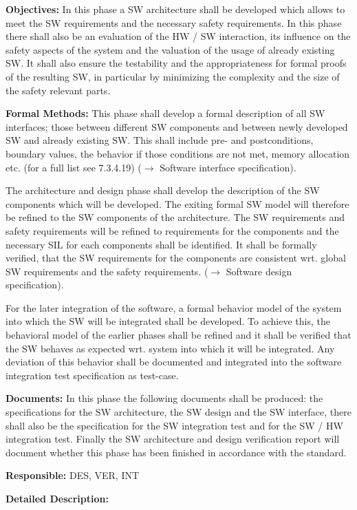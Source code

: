 {\bf Objectives:} In this phase a SW architecture shall be developed which
allows to meet the SW requirements and the necessary safety requirements. In
this phase there shall also be an evaluation of the HW / SW interaction, its
influence on the safety aspects of the system and the valuation of the usage of
already existing SW. It shall also ensure the testability and the
appropriateness for formal proofs of the resulting SW, in particular by
minimizing the complexity and the size of the safety relevant parts.

{\bf Formal Methods:} This phase shall develop a formal description of all SW
interfaces; those between different SW components and between newly developed SW
and already existing SW. This shall include pre- and postconditions, boundary
values, the behavior if those conditions are not met, memory allocation
etc. (for a full list see 7.3.4.19) ($\rightarrow$ Software interface
specification).

The architecture and design phase shall develop the description of the SW
components which will be developed. The exiting formal SW model will therefore
be refined to the SW components of the architecture. The SW requirements and
safety requirements will be refined to requirements for the components and the
necessary SIL for each components shall be identified. It shall be formally
verified, that the SW requirements for the components are consistent wrt. global
SW requirements and the safety requirements. ($\rightarrow$ Software design
specification).

For the later integration of the software, a formal behavior model of the system
into which the SW will be integrated shall be developed. To achieve this, the
behavioral model of the earlier phases shall be refined and it shall be verified
that the SW behaves as expected wrt. system into which it will be
integrated. Any deviation of this behavior shall be documented and integrated
into the software integration test specification as test-case.

{\bf Documents:} In this phase the following documents shall be produced: the
specifications for the SW architecture, the SW design and the SW interface,
there shall also be the specification for the SW integration test and for the SW
/ HW integration test. Finally the SW architecture and design verification
report will document whether this phase has been finished in accordance with
the standard.

{\bf Responsible:} DES, VER, INT

{\bf Detailed Description:}

